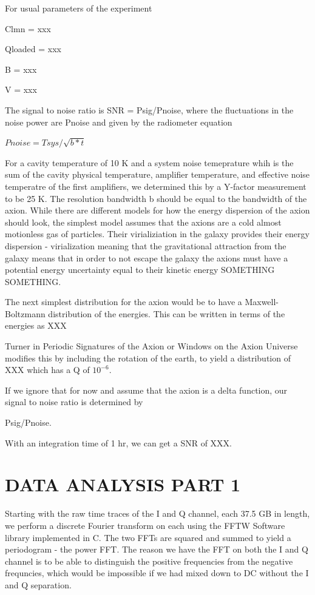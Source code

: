 \documentclass[11pt]{article}
\begin{document}
For usual parameters of the experiment

Clmn = xxx

Qloaded = xxx

B = xxx

V = xxx

The signal to noise ratio is SNR = Psig/Pnoise, where the fluctuations in the noise power are Pnoise and given by the radiometer equation

$Pnoise = Tsys/\sqrt{b*t} $

For a cavity temperature of 10 K and a system noise temeprature whih is the sum of the cavity physical temperature, amplifier temperature, and effective noise temperatre of the first amplifiers, we determined this by a Y-factor measurement to be 25 K. The resolution bandwidth b should be equal to the bandwidth of the axion. While there are different models for how the energy dispersion of the axion should look, the simplest model assumes that the axions are a cold almost motionless gas of particles. Their virializiation in the galaxy provides their energy dispersion - virialization meaning that the gravitational attraction from the galaxy means that in order to not escape the galaxy the axions must have a potential energy uncertainty equal to their kinetic energy SOMETHING SOMETHING.

The next simplest distribution for the axion would be to have a Maxwell-Boltzmann distribution of the energies. This can be written in terms of the energies as XXX

Turner in Periodic Signatures of the Axion or Windows on the Axion Universe modifies this by including the rotation of the earth, to yield a distribution of XXX which has a Q of $10^{-6}$.

If we ignore that for now and assume that the axion is a delta function, our signal to noise ratio is determined by 

Psig/Pnoise.

With an integration time of 1 hr, we can get a SNR of XXX.

\section{DATA ANALYSIS PART 1}

Starting with the raw time traces of the I and Q channel, each 37.5 GB in length, we perform a discrete Fourier transform on each using the FFTW Software library implemented in C. The two FFTs are squared and summed to yield a periodogram - the power FFT. The reason we have the FFT on both the I and Q channel is to be able to distinguish the positive frequencies from the negative frequncies, which would be impossible if we had mixed down to DC without the I and Q separation.
\end{document}
